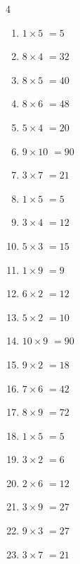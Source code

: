 \begin{multicols}{4}
\begin{enumerate}
  \item $1\times 5$
        $=5$

  \item $8\times 4$
        $=32$

  \item $8\times 5$
        $=40$

  \item $8\times 6$
        $=48$

  \item $5\times 4$
        $=20$

  \item $9\times 10$
        $=90$

  \item $3\times 7$
        $=21$

  \item $1\times 5$
        $=5$

  \item $3\times 4$
        $=12$

  \item $5\times 3$
        $=15$

  \item $1\times 9$
        $=9$

  \item $6\times 2$
        $=12$

  \item $5\times 2$
        $=10$

  \item $10\times 9$
        $=90$

  \item $9\times 2$
        $=18$

  \item $7\times 6$
        $=42$

  \item $8\times 9$
        $=72$

  \item $1\times 5$
        $=5$

  \item $3\times 2$
        $=6$

  \item $2\times 6$
        $=12$

  \item $3\times 9$
        $=27$

  \item $9\times 3$
        $=27$

  \item $3\times 7$
        $=21$


\end{enumerate}
\end{multicols}
